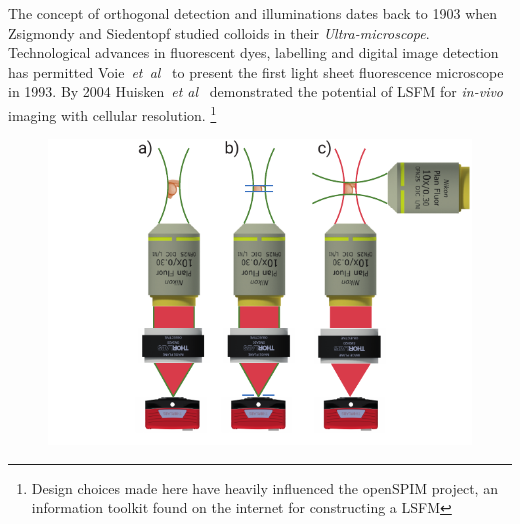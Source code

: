 \pagebreak

The concept of orthogonal detection and illuminations dates back to 1903 when Zsigmondy and Siedentopf studied colloids in their \textit{Ultra-microscope}.
Technological advances in fluorescent dyes, labelling and digital image detection has permitted Voie~\emph{et~al}~\cite{voie_orthogonal-plane_1993}
to present the first light sheet fluorescence microscope in 1993.
By 2004 Huisken~\emph{et al}~\cite{huisken_optical_2004-1}
demonstrated the potential of LSFM for \emph{in-vivo} imaging with cellular resolution.
\footnote{Design choices made here have heavily influenced the openSPIM project, an information toolkit found on the internet for constructing a LSFM}


\begin{figure}
    \centering
    \includegraphics{./epi_con_lsfm}
    \caption{}
    \label{fig:epi_con_lsfm}
\end{figure}


